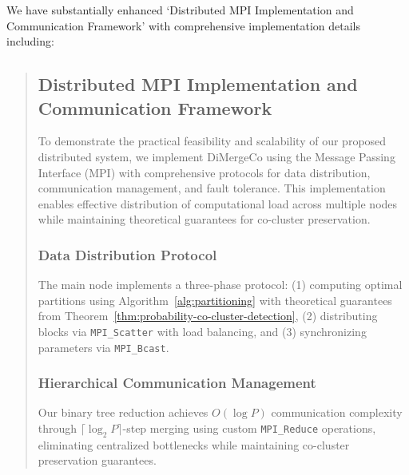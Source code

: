 \documentclass{ar2rc}
\begin{document}
We have substantially enhanced  `Distributed MPI Implementation and Communication Framework' with comprehensive implementation details including:

\begin{quote}
  \subsection*{ Distributed MPI Implementation and Communication Framework}
  To demonstrate the practical feasibility and scalability of our proposed distributed system, we implement DiMergeCo using the Message Passing Interface (MPI) with comprehensive protocols for data distribution, communication management, and fault tolerance. This implementation enables effective distribution of computational load across multiple nodes while maintaining theoretical guarantees for co-cluster preservation.
  \subsubsection*{ Data Distribution Protocol}
  The main node implements a three-phase protocol: (1) computing optimal partitions using Algorithm~\ref{alg:partitioning} with theoretical guarantees from Theorem~\ref{thm:probability-co-cluster-detection}, (2) distributing blocks via \texttt{MPI\_Scatter} with load balancing, and (3) synchronizing parameters via \texttt{MPI\_Bcast}.

  \subsubsection*{ Hierarchical Communication Management}
  Our binary tree reduction achieves $O(\log P)$ communication complexity through $\lceil \log_2 P \rceil$-step merging using custom \texttt{MPI\_Reduce} operations, eliminating centralized bottlenecks while maintaining co-cluster preservation guarantees.
\end{quote}


\end{document}
